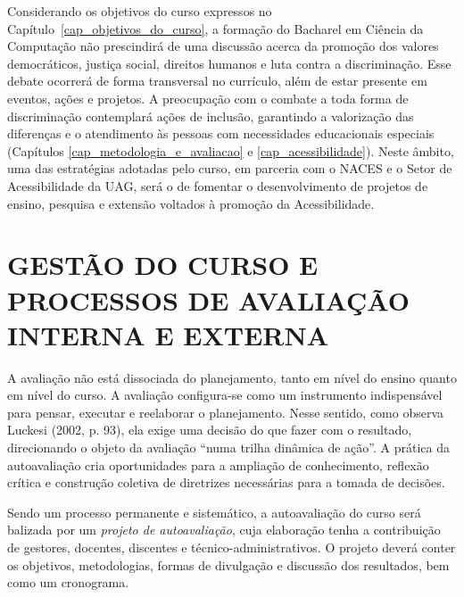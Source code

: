 \documentclass[
	12pt,				%
	openright,			%
  oneside,     %
	a4paper,			%
	chapter=TITLE,		%
	english,			%
	french,				%
	spanish,			%
	brazil				%
	]{abntex2}
\begin{document}
Considerando os objetivos do curso expressos no Capítulo~\ref{cap_objetivos_do_curso}, a formação do Bacharel em Ciência da Computação não prescindirá de uma discussão acerca da promoção dos valores democráticos, justiça social, direitos humanos e luta contra a discriminação. Esse debate ocorrerá de forma transversal no currículo, além de estar presente em eventos, ações e projetos. A preocupação com o combate a toda forma de discriminação contemplará ações de inclusão, garantindo a valorização das diferenças e o atendimento às pessoas com necessidades educacionais especiais (Capítulos \ref{cap_metodologia_e_avaliacao} e \ref{cap_acessibilidade}). Neste âmbito, uma das estratégias adotadas pelo curso, em parceria com o NACES e o Setor de Acessibilidade da UAG, será o de fomentar o desenvolvimento de projetos de ensino, pesquisa e extensão voltados à promoção da Acessibilidade.






%
%






\chapter{GESTÃO DO CURSO E PROCESSOS DE AVALIAÇÃO INTERNA E EXTERNA}
\label{cap_gestao_do_curso_e_processos_de_avaliacao_interna_e_externa}

A avaliação não está dissociada do planejamento, tanto em nível do ensino quanto em nível do curso. A avaliação configura-se como um instrumento indispensável para pensar, executar e reelaborar o planejamento. Nesse sentido, como observa Luckesi (2002, p. 93), ela exige uma decisão do que fazer com o resultado, direcionando o objeto da avaliação “numa trilha dinâmica de ação”. A prática da autoavaliação cria oportunidades para a ampliação de conhecimento, reflexão crítica e construção coletiva de diretrizes necessárias para a tomada de decisões.

Sendo um processo permanente e sistemático, a autoavaliação do curso será balizada por um \textit{projeto de autoavaliação}, cuja elaboração tenha a contribuição de gestores, docentes, discentes e técnico-administrativos. O projeto deverá conter os objetivos, metodologias, formas de divulgação e discussão dos resultados, bem como um cronograma.
\end{document}
